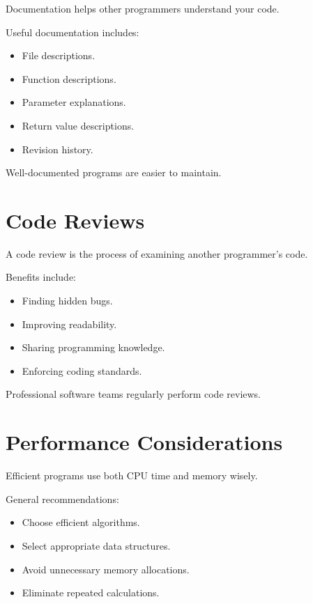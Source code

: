 \documentclass[12pt,openany]{book}
\begin{document}
Documentation helps other programmers understand your code.

Useful documentation includes:

\begin{itemize}
    \item File descriptions.
    \item Function descriptions.
    \item Parameter explanations.
    \item Return value descriptions.
    \item Revision history.
\end{itemize}

Well-documented programs are easier to maintain.

\section{Code Reviews}

A code review is the process of examining another programmer's code.

Benefits include:

\begin{itemize}
    \item Finding hidden bugs.
    \item Improving readability.
    \item Sharing programming knowledge.
    \item Enforcing coding standards.
\end{itemize}

Professional software teams regularly perform code reviews.

\section{Performance Considerations}

Efficient programs use both CPU time and memory wisely.

General recommendations:

\begin{itemize}
    \item Choose efficient algorithms.
    \item Select appropriate data structures.
    \item Avoid unnecessary memory allocations.
    \item Eliminate repeated calculations.
\end{itemize}
\end{document}
